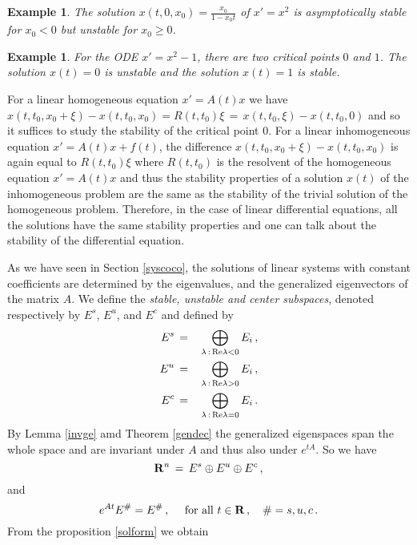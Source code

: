 \documentclass[12pt]{report}
\newcommand{\bR}{{\bf R}}
\newtheorem{example}[theorem]{Example}
\begin{document}
\begin{example} {\rm
The solution $x(t,0,x_0)= \frac{x_0}{1-x_0t}$ of $x'=x^2$ is
asymptotically stable for $x_0 < 0$ but unstable for $x_0 \ge 0$.  }
\end{example}

\begin{example}{\rm  
For the ODE $x'= x^2-1$, there are two critical points $0$ and $1$.
The solution $x(t)=0$ is unstable and the solution $x(t)=1$ is stable.
}
\end{example}


For a linear homogeneous equation $x'=A(t)x$ we have 
$x(t,t_0,x_0+\xi)- x(t,t_0,x_0)= R(t,t_0) \xi \,=\,x(t,t_0,\xi)- x(t,t_0,0)$ and 
so it  suffices to study the stability of the critical point $0$.
For a linear inhomogeneous equation $x' = A(t) x +f(t)$, 
the difference $x(t,t_0,x_0+\xi)- x(t,t_0,x_0)$ is again equal to  $R(t,t_0) \xi$ 
where $R(t,t_0)$ is the resolvent of the homogeneous equation $x'=A(t)x$
and thus the stability properties of a solution $x(t)$ of the inhomogeneous
problem are the same as the stability of the trivial solution of the
homogeneous problem.  Therefore, in the case of linear differential
equations, all the solutions have the same stability properties and
one can talk about the stability of the differential equation.


As we have seen in Section \ref{syscoco}, the solutions of linear 
systems with constant coefficients are determined by the eigenvalues, 
and the generalized eigenvectors of the matrix $A$.   We define the {\em stable, unstable and center subspaces}, denoted 
respectively by $E^s$, $E^u$, and $E^c$ and defined by
\begin{eqnarray} 
E^{s} \,&=&\, \bigoplus_{\lambda \,:\, {\rm Re} \lambda < 0} E_i \,, \\
E^{u} \,&=&\, \bigoplus_{\lambda \,:\, {\rm Re} \lambda > 0} E_i \,, \\
E^{c} \,&=&\, \bigoplus_{\lambda \,:\, {\rm Re} \lambda = 0} E_i \,. \\
\end{eqnarray}
By Lemma \ref{invge} amd Theorem \ref{gendec} the generalized eigenspaces span the whole space and are invariant 
under $A$  and thus also under $e^{tA}$. So we have 
\begin{equation}
\bR^n \,=\, E^s \oplus E^u  \oplus E^c \,,
\end{equation}
and 
\begin{equation} 
e^{At} E^\#  = E^\# \,, \quad  {\rm ~for~all~} t \in \bR\,, \quad \#=s,u,c \,.
\end{equation}
From the proposition \ref{solform} we obtain 
\end{document}
